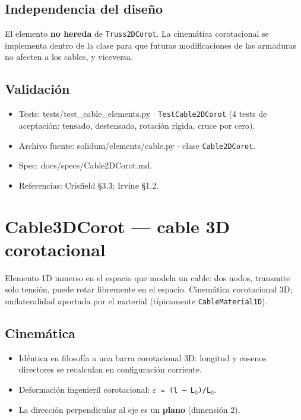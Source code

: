 \documentclass[11pt,letterpaper,oneside]{report}
\begin{document}
\subsection{Independencia del diseño}
El elemento \textbf{no hereda} de \texttt{Truss2DCorot}. La cinemática corotacional se implementa dentro de la clase para que futuras modificaciones de las armaduras no afecten a los cables, y viceversa.

\subsection{Validación}
\begin{itemize}
  \item Tests: tests/test\_cable\_elements.py \ensuremath{\cdot} \texttt{TestCable2DCorot} (4 tests de aceptación: tensado, destensado, rotación rígida, cruce por cero).
  \item Archivo fuente: solidum/elements/cable.py \ensuremath{\cdot} clase \texttt{Cable2DCorot}.
  \item Spec: docs/specs/Cable2DCorot.md.
  \item Referencias: Crisfield §3.3; Irvine §1.2.
\end{itemize}


\section{Cable3DCorot --- cable 3D corotacional}

Elemento 1D inmerso en el espacio que modela un cable: dos nodos, transmite solo tensión, puede rotar libremente en el espacio. Cinemática corotacional 3D; unilateralidad aportada por el material (típicamente \texttt{CableMaterial1D}).

\subsection{Cinemática}
\begin{itemize}
  \item Idéntica en filosofía a una barra corotacional 3D: longitud y cosenos directores se recalculan en configuración corriente.
  \item Deformación ingenieril corotacional: \texttt{\ensuremath{\varepsilon} = (l − L\ensuremath{_{0}})/L\ensuremath{_{0}}}.
  \item La dirección perpendicular al eje es un \textbf{plano} (dimensión 2).
\end{itemize}
\end{document}
